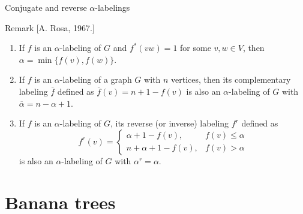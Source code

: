 \documentclass{beamer}
\begin{document}
\begin{frame}{Conjugate and reverse $\alpha$-labelings}
  \begin{block}{Remark [A. Rosa, 1967.]}
    \begin{enumerate}
      \item If $f$ is an $\alpha$-labeling of $G$ and $f^*(vw) = 1$ for some $v, w \in V$, then $\alpha = \min\{f(v), f(w)\}$.
      \item If $f$ is an $\alpha$-labeling of a graph $G$ with $n$ vertices, then its complementary labeling $\overline{f}$ defined as $\overline{f}(v) = n + 1 - f(v)$ is also an $\alpha$-labeling of $G$ with $\overline{\alpha} = n - \alpha + 1$.
      \item If $f$ is an $\alpha$-labeling of $G$, its reverse (or inverse) labeling $f^r$ defined as
        $$
        f^r(v) =
        \begin{cases}
          \alpha + 1 - f(v), & f(v) \leq \alpha \\
          n + \alpha + 1 - f(v), & f(v) > \alpha
        \end{cases}
        $$
        is also an $\alpha$-labeling of $G$ with $\alpha^r = \alpha$.
    \end{enumerate}
  \end{block}
\end{frame}

\section{Banana trees}
\end{document}
